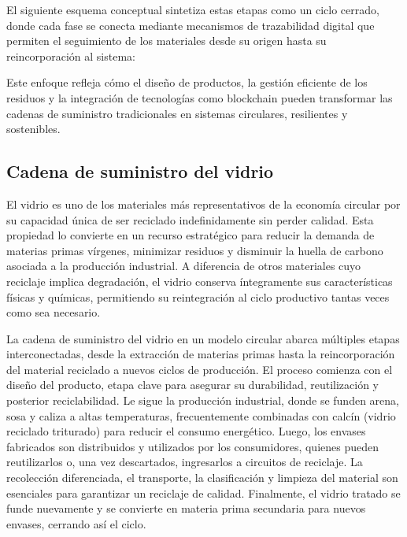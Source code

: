 El siguiente esquema conceptual sintetiza estas etapas como un ciclo cerrado, donde cada fase se conecta mediante mecanismos de trazabilidad digital que permiten el seguimiento de los materiales desde su origen hasta su reincorporación al sistema:


Este enfoque refleja cómo el diseño de productos, la gestión eficiente de los residuos y la integración de tecnologías como blockchain pueden transformar las cadenas de suministro tradicionales en sistemas circulares, resilientes y sostenibles.

\subsection{Cadena de suministro del vidrio}

El vidrio es uno de los materiales más representativos de la economía circular por su capacidad única de ser reciclado indefinidamente sin perder calidad. Esta propiedad lo convierte en un recurso estratégico para reducir la demanda de materias primas vírgenes, minimizar residuos y disminuir la huella de carbono asociada a la producción industrial. A diferencia de otros materiales cuyo reciclaje implica degradación, el vidrio conserva íntegramente sus características físicas y químicas, permitiendo su reintegración al ciclo productivo tantas veces como sea necesario.

La cadena de suministro del vidrio en un modelo circular abarca múltiples etapas interconectadas, desde la extracción de materias primas hasta la reincorporación del material reciclado a nuevos ciclos de producción. El proceso comienza con el diseño del producto, etapa clave para asegurar su durabilidad, reutilización y posterior reciclabilidad. Le sigue la producción industrial, donde se funden arena, sosa y caliza a altas temperaturas, frecuentemente combinadas con calcín (vidrio reciclado triturado) para reducir el consumo energético. Luego, los envases fabricados son distribuidos y utilizados por los consumidores, quienes pueden reutilizarlos o, una vez descartados, ingresarlos a circuitos de reciclaje. La recolección diferenciada, el transporte, la clasificación y limpieza del material son esenciales para garantizar un reciclaje de calidad. Finalmente, el vidrio tratado se funde nuevamente y se convierte en materia prima secundaria para nuevos envases, cerrando así el ciclo.

